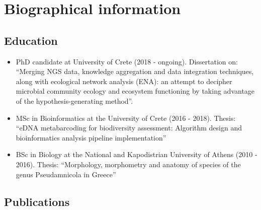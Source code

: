 \documentclass{article}
\begin{document}
\section{Biographical information}
\subsection{Education}

\begin{itemize}

   \item PhD candidate at University of Crete (2018 - ongoing). Dissertation on: “Merging NGS data, knowledge aggregation and data integration techniques, along with ecological network analysis (ENA): an attempt to decipher microbial community ecology and ecosystem functioning by taking advantage of the hypothesis-generating method”.
   \item MSc in Bioinformatics at the University of Crete (2016 - 2018). Thesis: “eDNA metabarcoding for biodiversity assessment: Algorithm design and bioinformatics analysis pipeline implementation”
   \item BSc in Biology at the National and Kapodistrian University of Athens (2010 - 2016). Thesis: “Morphology, morphometry and anatomy of species of the genus Pseudamnicola in Greece” 

\end{itemize}


\subsection{Publications}
\end{document}

